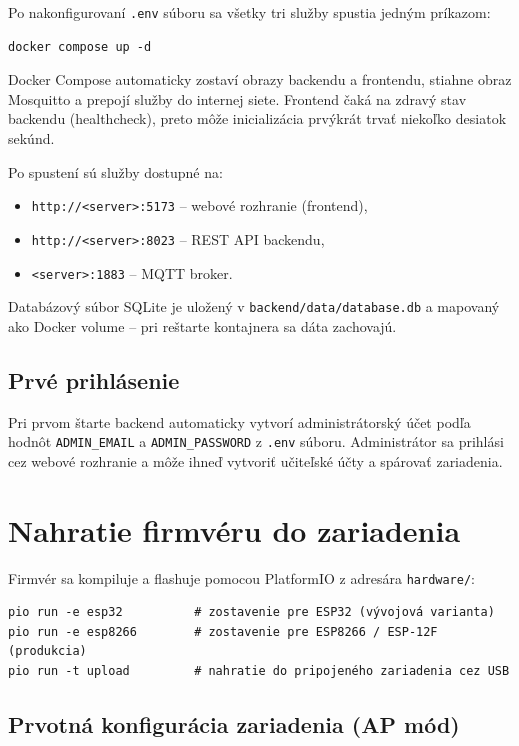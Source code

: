 Po nakonfigurovaní \texttt{.env} súboru sa všetky tri služby spustia jedným príkazom:

\begin{verbatim}
docker compose up -d
\end{verbatim}

Docker Compose automaticky zostaví obrazy backendu a frontendu, stiahne obraz Mosquitto a prepojí služby do internej siete. Frontend čaká na zdravý stav backendu (healthcheck), preto môže inicializácia prvýkrát trvať niekoľko desiatok sekúnd.

Po spustení sú služby dostupné na:
\begin{itemize}
    \item \texttt{http://<server>:5173} -- webové rozhranie (frontend),
    \item \texttt{http://<server>:8023} -- REST API backendu,
    \item \texttt{<server>:1883} -- MQTT broker.
\end{itemize}

Databázový súbor SQLite je uložený v \texttt{backend/data/database.db} a mapovaný ako Docker volume -- pri reštarte kontajnera sa dáta zachovajú.

\subsection*{Prvé prihlásenie}

Pri prvom štarte backend automaticky vytvorí administrátorský účet podľa hodnôt \texttt{ADMIN\_EMAIL} a \texttt{ADMIN\_PASSWORD} z \texttt{.env} súboru. Administrátor sa prihlási cez webové rozhranie a môže ihneď vytvoriť učiteľské účty a spárovať zariadenia.

\section{Nahratie firmvéru do zariadenia}
\label{sec:deployment-firmware}

Firmvér sa kompiluje a flashuje pomocou PlatformIO z adresára \texttt{hardware/}:

\begin{verbatim}
pio run -e esp32          # zostavenie pre ESP32 (vývojová varianta)
pio run -e esp8266        # zostavenie pre ESP8266 / ESP-12F (produkcia)
pio run -t upload         # nahratie do pripojeného zariadenia cez USB
\end{verbatim}

\subsection*{Prvotná konfigurácia zariadenia (AP mód)}

